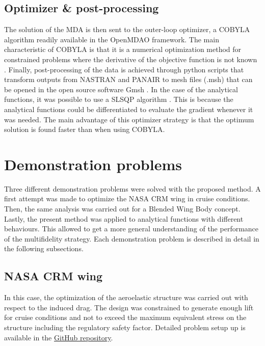 \documentclass[conf]{new-aiaa}
\begin{document}
\subsection{Optimizer \& post-processing}
The solution of the MDA is then sent to the outer-loop optimizer, a COBYLA algorithm readily available in the OpenMDAO framework.  The main characteristic of COBYLA is that it is a numerical optimization method for constrained problems where the derivative of the objective function is not known \cite{powell1994direct}. Finally, post-processing of the data is achieved through python scripts that transform outputs from NASTRAN and PANAIR to mesh files (.msh) that can be opened in the open source software Gmsh \cite{geuzaine2009gmsh}. 
In the case of the analytical functions, it was possible to use a SLSQP algorithm \cite{kraft1989slsqp}. This is because the analytical functions could be differentiated to evaluate the gradient whenever it was needed. The main advantage of this optimizer strategy is that the optimum solution is found faster than when using COBYLA.   

\section{Demonstration problems}
\label{sec:Demonstration}
Three different demonstration problems were solved with the proposed method. A first attempt was made to optimize the NASA CRM wing in cruise conditions. Then, the same analysis was carried out for a Blended Wing Body concept. Lastly, the present method was applied to analytical functions with different behaviours. This allowed to get a more general understanding of the performance of the multifidelity strategy. Each demonstration problem is described in detail in the following subsections. 

\subsection{NASA CRM wing}
In this case, the optimization of the aeroelastic structure was carried out with respect to the induced drag. The design was constrained to generate enough lift for cruise conditions and not to exceed the maximum equivalent stress on the structure including the regulatory safety factor. Detailed problem setup up is available in the \href{https://github.com/mid2SUPAERO/RP_MAE_GILBERTO_RUIZ_JIMENEZ}{GitHub repository}.
\end{document}
